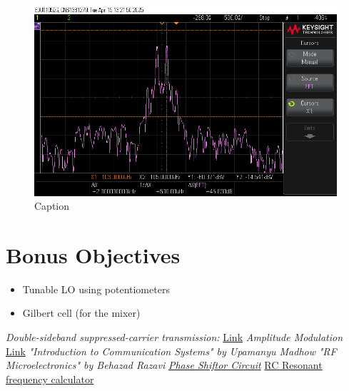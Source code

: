 \documentclass[conference]{IEEEtran}
\begin{document}
\begin{figure}
    \centering
    \includegraphics[width=1\linewidth]{Images/modulated_output_fft.png}
    \caption{Caption}
    \label{fig:enter-label}
\end{figure}
\section{Bonus Objectives}
\begin{itemize}
    \item Tunable LO using potentiometers
    \item Gilbert cell (for the mixer)
\end{itemize}

\begin{thebibliography}{00}
\textit{Double-sideband suppressed-carrier transmission: }
\href{https://en.wikipedia.org/wiki/Double-sideband_suppressed-carrier_transmission}{Link}
\textit{Amplitude Modulation}
\href{https://en.wikipedia.org/wiki/Amplitude_modulation}{Link}
\textit{"Introduction to Communication Systems" by Upamanyu Madhow}
\textit{"RF Microelectronics" by Behazad Razavi}
\href{https://vesit.ves.ac.in/RC_phase_shift/theory}{\textit{Phase Shiftor Circuit}}
\href{https://www.omnicalculator.com/physics/rc-circuit}{RC Resonant frequency calculator}
\end{thebibliography}
\end{document}
